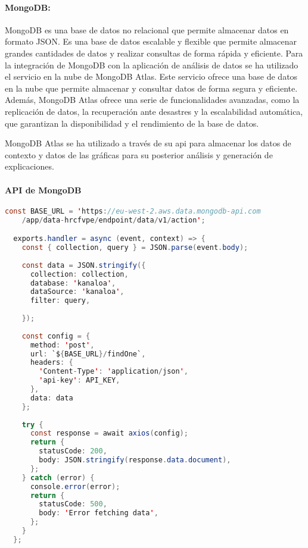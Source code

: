 \paragraph{MongoDB: } MongoDB es una base de datos no relacional que permite almacenar datos en formato JSON. Es una base de datos
escalable y flexible que permite almacenar grandes cantidades de datos y realizar consultas de forma rápida y eficiente.
Para la integración de MongoDB con la aplicación de análisis de datos se ha utilizado el servicio en la nube de MongoDB Atlas.
Este servicio ofrece una base de datos en la nube que permite almacenar y consultar datos de forma segura y eficiente. Además, MongoDB Atlas
ofrece una serie de funcionalidades avanzadas, como la replicación de datos, la recuperación ante desastres y la escalabilidad automática,
que garantizan la disponibilidad y el rendimiento de la base de datos.

MongoDB Atlas se ha utilizado a través de su api para almacenar los datos de contexto y datos de las gráficas para su posterior análisis
y generación de explicaciones. 

\paragraph{API de MongoDB}
\begin{lstlisting}[language=Java]
  const BASE_URL = 'https://eu-west-2.aws.data.mongodb-api.com
    /app/data-hrcfvpe/endpoint/data/v1/action';

  exports.handler = async (event, context) => {
    const { collection, query } = JSON.parse(event.body);
  
    const data = JSON.stringify({
      collection: collection,
      database: 'kanaloa',
      dataSource: 'kanaloa',
      filter: query,
    
    });
  
    const config = {
      method: 'post',
      url: `${BASE_URL}/findOne`,
      headers: {
        'Content-Type': 'application/json',
        'api-key': API_KEY,
      },
      data: data
    };
  
    try {
      const response = await axios(config);
      return {
        statusCode: 200,
        body: JSON.stringify(response.data.document),
      };
    } catch (error) {
      console.error(error);
      return {
        statusCode: 500,
        body: 'Error fetching data',
      };
    }
  };
\end{lstlisting}
    


